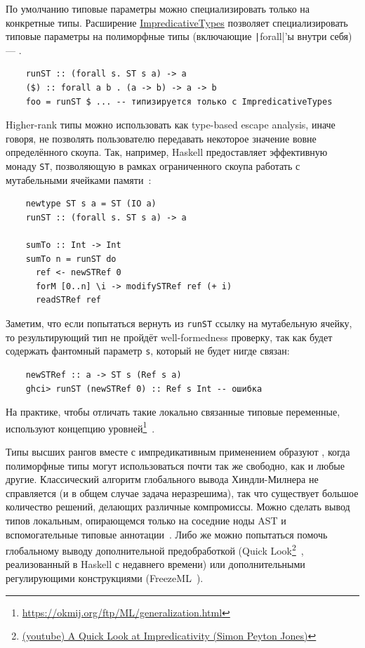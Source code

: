 По умолчанию типовые параметры можно специализировать только на конкретные типы.
Расширение \href{https://downloads.haskell.org/ghc/latest/docs/users_guide/exts/impredicative_types.html}{ImpredicativeTypes} позволяет специализировать типовые параметры на полиморфные типы (включающие \texttt|forall|'ы внутри себя) --- .
\begin{verbatim}
    runST :: (forall s. ST s a) -> a
    ($) :: forall a b . (a -> b) -> a -> b
    foo = runST $ ... -- типизируется только с ImpredicativeTypes
\end{verbatim}

Higher-rank типы можно использовать как type-based escape analysis, иначе говоря, не позволять пользователю передавать некоторое значение вовне определённого скоупа.
Так, например, Haskell предоставляет эффективную монаду \texttt{ST}, позволяющую в рамках ограниченного скоупа работать с мутабельными ячейками памяти~\cite{launchbury1995state}:
\begin{verbatim}
    newtype ST s a = ST (IO a)
    runST :: (forall s. ST s a) -> a

    sumTo :: Int -> Int
    sumTo n = runST do
      ref <- newSTRef 0
      forM [0..n] \i -> modifySTRef ref (+ i)
      readSTRef ref
\end{verbatim}
Заметим, что если попытаться вернуть из \texttt{runST} ссылку на мутабельную ячейку, то результирующий тип не пройдёт well-formedness проверку, так как будет содержать фантомный параметр \texttt{s}, который не будет нигде связан:
\begin{verbatim}
    newSTRef :: a -> ST s (Ref s a)
    ghci> runST (newSTRef 0) :: Ref s Int -- ошибка
\end{verbatim}
На практике, чтобы отличать такие локально связанные типовые переменные, используют концепцию уровней\footnote{\url{https://okmij.org/ftp/ML/generalization.html}}~\cite{peytonjones2019typeinference}.

Типы высших рангов вместе с импредикативным применением образуют , когда полиморфные типы могут использоваться почти так же свободно, как и любые другие.
Классический алгоритм глобального вывода Хиндли-Милнера не справляется (и в общем случае задача неразрешима), так что существует большое количество решений, делающих различные компромиссы.
Можно сделать вывод типов локальным, опирающемся только на соседние ноды AST и вспомогательные типовые аннотации~\cite{pierce2000local, christiansen2013bidirectional, dunfield2019sound}.
Либо же можно попытаться помочь глобальному выводу дополнительной предобработкой (Quick Look\footnote{\href{https://youtu.be/ZuNMo136QqI?si=qp8PAEeeF-bioCB_}{(youtube) A Quick Look at Impredicativity (Simon Peyton Jones)}}~\cite{serrano2020quick}, реализованный в Haskell с недавнего времени) или дополнительными регулирующими конструкциями (FreezeML~\cite{emrich2020freezeml}).

